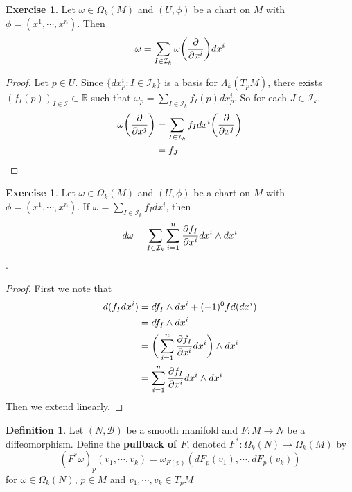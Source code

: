 \documentclass[12pt]{amsart}
\theoremstyle{definition}
\newtheorem{defn}[definition]{Definition}
\newtheorem{ex}[definition]{Exercise}
\newcommand{\Lam}{\Lambda}
\newcommand{\om}{\omega}
\newcommand{\Om}{\Omega}
\newcommand{\R}{\mathbb{R}}
\newcommand{\MB}{\mathcal{B}}
\newcommand{\MI}{\mathcal{I}}
\begin{document}
	\begin{ex}
		Let $\om \in \Om_k(M)$ and $(U, \phi)$ be a chart on $M$ with $\phi = (x^1, \cdots, x^n)$. Then $$\om = \sum_{I \in \MI_k}\om \bigg(\pdv{x^i} \bigg) dx^i$$
	\end{ex}

	\begin{proof}
		Let $p \in U$. Since $\{dx^i_p: I \in \MI_k\}$ is a basis for $\Lam_k(T_pM)$, there exists $(f_I(p))_{I \in \MI} \subset \R$ such that $\om_p = \sum\limits_{I \in \MI_k} f_I(p) dx^i_p$. So for each $J \in \MI_k$, 
		\begin{align*}
			\om\bigg (\pdv{x^j} \bigg ) 
			&= \sum\limits_{I \in \MI_k} f_I dx^i \bigg (\pdv{x^j} \bigg )  \\
			&= f_J
		\end{align*} 
	\end{proof}

	\begin{ex}
		Let $\om \in \Om_k(M)$ and $(U, \phi)$ be a chart on $M$ with $\phi = (x^1, \cdots, x^n)$. If $\om = \sum\limits_{I \in \MI_k}f_I dx^i$, then $$d \om  = \sum_{I \in \MI_k} \sum_{i =1}^n \pdv{f_I}{x^i} dx^i \wedge dx^i$$.
	\end{ex}

	\begin{proof}
		First we note that
		\begin{align*}
			d(f_I dx^i) 
			&= df_I \wedge dx^i + (-1)^0 f d(dx^i) \\
			&= df_I \wedge dx^i \\
			&= \bigg( \sum\limits_{i=1}^n \pdv{f_I}{x^i}dx^i  \bigg) \wedge dx^i \\
			&= \sum\limits_{i=1}^n {\pdv{f_I}{x^i}}dx^i \wedge dx^i \\
		\end{align*}
		Then we extend linearly.
	\end{proof}
	
	
	\begin{defn}
		Let $(N, \MB)$ be a smooth manifold and $F: M \rightarrow N$ be a diffeomorphism. Define the \textbf{pullback of $F$}, denoted $F^*: \Om_k(N) \rightarrow \Om_k(M)$ by  $$(F^* \om)_p (v_1, \cdots, v_k) = \om_{F(p)} (dF_p(v_1), \cdots, dF_p(v_k))$$ for $\om \in \Om_k(N)$, $p \in M$ and $v_1, \cdots, v_k \in T_{p}M$
	\end{defn}
\end{document}
